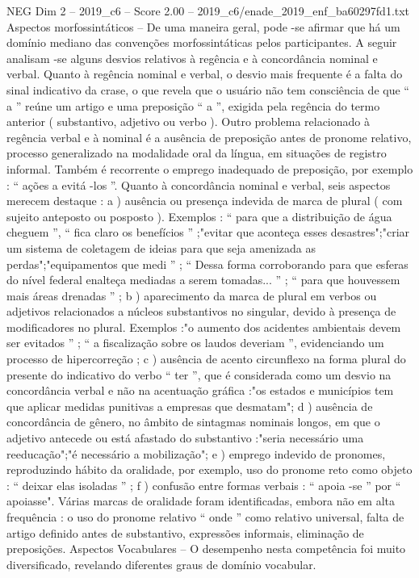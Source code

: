 \begin{textsample}{NEG Dim 2 – 2019\_c6 – Score 2.00 – 2019\_c6/enade\_2019\_enf\_ba60297fd1.txt}
Aspectos morfossintáticos – De uma maneira geral, pode -se afirmar que há um domínio mediano das convenções morfossintáticas pelos participantes.
A seguir analisam -se alguns desvios relativos à regência e à concordância nominal e verbal.
Quanto à regência nominal e verbal, o desvio mais frequente é a falta do sinal indicativo da crase, o que revela que o usuário não tem consciência de que “ a ” reúne um artigo e uma preposição “ a ”, exigida pela regência do termo anterior ( substantivo, adjetivo ou verbo ).
Outro problema relacionado à regência verbal e à nominal é a ausência de preposição antes de pronome relativo, processo generalizado na modalidade oral da língua, em situações de registro informal.
Também é recorrente o emprego inadequado de preposição, por exemplo : “ ações a evitá -los ”.
Quanto à concordância nominal e verbal, seis aspectos merecem destaque : a ) ausência ou presença indevida de marca de plural ( com sujeito anteposto ou posposto ).
Exemplos : “ para que a distribuição de água cheguem ”, “ fica claro os benefícios ” ;"evitar que aconteça esses desastres";"criar um sistema de coletagem de ideias para que seja amenizada as perdas";"equipamentos que medi ” ; “ Dessa forma corroborando para que esferas do nível federal enalteça mediadas a serem tomadas... ” ; “ para que houvessem mais áreas drenadas ” ; b ) aparecimento da marca de plural em verbos ou adjetivos relacionados a núcleos substantivos no singular, devido à presença de modificadores no plural.
Exemplos :"o aumento dos acidentes ambientais devem ser evitados ” ; “ a fiscalização sobre os laudos deveriam ”, evidenciando um processo de hipercorreção ; c ) ausência de acento circunflexo na forma plural do presente do indicativo do verbo “ ter ”, que é considerada como um desvio na concordância verbal e não na acentuação gráfica :"os estados e municípios tem que aplicar medidas punitivas a empresas que desmatam"; d ) ausência de concordância de gênero, no âmbito de sintagmas nominais longos, em que o adjetivo antecede ou está afastado do substantivo :"seria necessário uma reeducação";"é necessário a mobilização"; e ) emprego indevido de pronomes, reproduzindo hábito da oralidade, por exemplo, uso do pronome reto como objeto : “ deixar elas isoladas ” ; f ) confusão entre formas verbais : “ apoia -se ” por “ apoiasse".
Várias marcas de oralidade foram identificadas, embora não em alta frequência : o uso do pronome relativo “ onde ” como relativo universal, falta de artigo definido antes de substantivo, expressões informais, eliminação de preposições.
Aspectos Vocabulares – O desempenho nesta competência foi muito diversificado, revelando diferentes graus de domínio vocabular.

\end{textsample}
